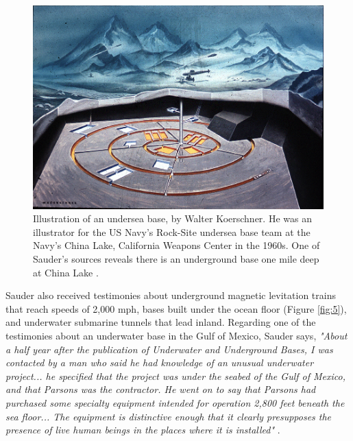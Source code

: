 \documentclass[10pt,twocolumn,letterpaper]{article}
\begin{document}
\begin{figure}[t]
\begin{center}
   \includegraphics[width=1\linewidth]{undersea.jpg}
\end{center}
   \caption{Illustration of an undersea base, by Walter Koerschner. He was an illustrator for the US Navy's Rock-Site undersea base team at the Navy's China Lake, California Weapons Center in the 1960s. One of Sauder's sources reveals there is an underground base one mile deep at China Lake \cite{22,23}.}
\label{fig:5}
\label{fig:onecol}
\end{figure}

Sauder also received testimonies about underground magnetic levitation trains that reach speeds of 2,000 mph, bases built under the ocean floor (Figure \ref{fig:5}), and underwater submarine tunnels that lead inland. Regarding one of the testimonies about an underwater base in the Gulf of Mexico, Sauder says, \textit{"About a half year after the publication of Underwater and Underground Bases, I was contacted by a man who said he had knowledge of an unusual underwater project... he specified that the project was under the seabed of the Gulf of Mexico, and that Parsons was the contractor. He went on to say that Parsons had purchased some specialty equipment intended for operation 2,800 feet beneath the sea floor... The equipment is distinctive enough that it clearly presupposes the presence of live human beings in the places where it is installed"} \cite{22}.
\end{document}
